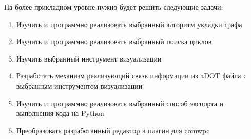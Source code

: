 На более прикладном уровне нужно будет решить следующие задачи:
\begin{enumerate}
\item Изучить и программно реализовать выбранный алгоритм укладки графа
\item Изучить и программно реализовать выбранный поиска циклов
\item Изучить выбранный инструмент визуализации
\item Разработать механизм реализующий связь информации из aDOT файла с выбранным инструментом визуализации
\item Изучить и программно реализовать выбранный способ экспорта и выполнения кода на Python
\item Преобразовать разработанный редактор в плагин для comwpc
\end{enumerate}

\noteattributes{}